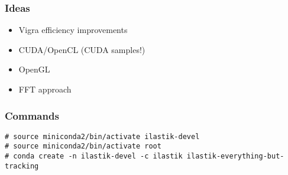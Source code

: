\documentclass[12pt,a4paper]{article}
\begin{document}
  \subsubsection{Ideas}
    \begin{itemize}
      \item Vigra efficiency improvements
      \item CUDA/OpenCL (CUDA samples!)
      \item OpenGL
      \item FFT approach
    \end{itemize}

  \subsubsection{Commands}

    \begin{lstlisting}[style=BashInputStyle]
# source miniconda2/bin/activate ilastik-devel
# source miniconda2/bin/activate root
# conda create -n ilastik-devel -c ilastik ilastik-everything-but-tracking
    \end{lstlisting}
\end{document}
